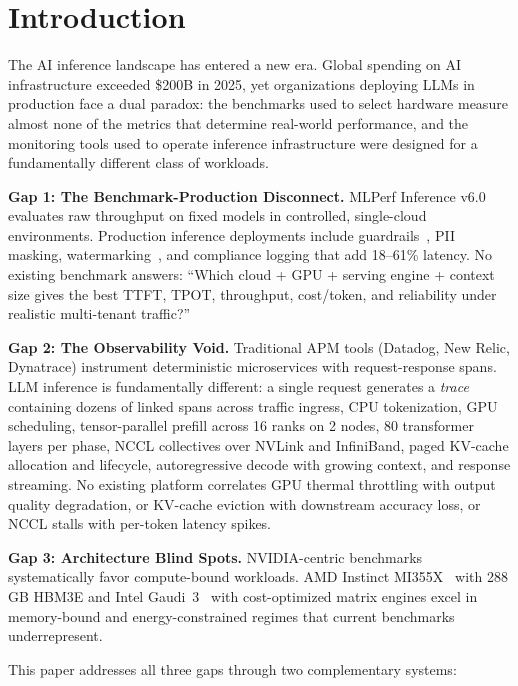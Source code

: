 \documentclass[conference,10pt]{IEEEtran}
\begin{document}
\section{Introduction}
The AI inference landscape has entered a new era. Global spending on AI infrastructure exceeded \$200B in 2025, yet organizations deploying LLMs in production face a dual paradox: the benchmarks used to select hardware measure almost none of the metrics that determine real-world performance, and the monitoring tools used to operate inference infrastructure were designed for a fundamentally different class of workloads.

\textbf{Gap 1: The Benchmark-Production Disconnect.} MLPerf Inference v6.0~\cite{mlcommons2026mlperfv6} evaluates raw throughput on fixed models in controlled, single-cloud environments. Production inference deployments include guardrails~\cite{inan2023llamaguard}, PII masking, watermarking~\cite{kirchner2024watermarking}, and compliance logging that add 18--61\% latency. No existing benchmark answers: ``Which cloud + GPU + serving engine + context size gives the best TTFT, TPOT, throughput, cost/token, and reliability under realistic multi-tenant traffic?''

\textbf{Gap 2: The Observability Void.} Traditional APM tools (Datadog, New Relic, Dynatrace) instrument deterministic microservices with request-response spans. LLM inference is fundamentally different: a single request generates a \emph{trace} containing dozens of linked spans across traffic ingress, CPU tokenization, GPU scheduling, tensor-parallel prefill across 16 ranks on 2 nodes, 80 transformer layers per phase, NCCL collectives over NVLink and InfiniBand, paged KV-cache allocation and lifecycle, autoregressive decode with growing context, and response streaming. No existing platform correlates GPU thermal throttling with output quality degradation, or KV-cache eviction with downstream accuracy loss, or NCCL stalls with per-token latency spikes.

\textbf{Gap 3: Architecture Blind Spots.} NVIDIA-centric benchmarks systematically favor compute-bound workloads. AMD Instinct MI355X~\cite{amd2025mi350} with 288\,GB HBM3E and Intel Gaudi~3~\cite{intel2025gaudi3} with cost-optimized matrix engines excel in memory-bound and energy-constrained regimes that current benchmarks underrepresent.

This paper addresses all three gaps through two complementary systems:
\end{document}
